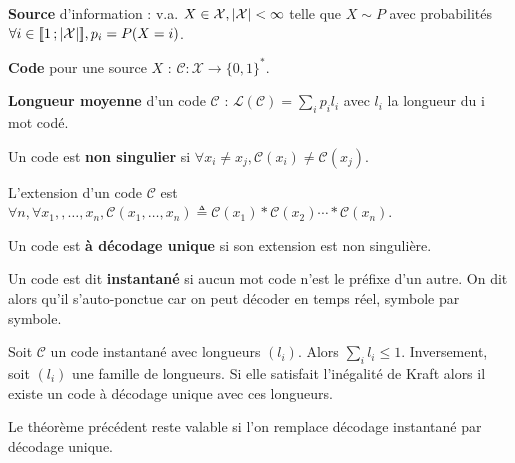 \begin{defn}
	\textbf{Source} d'information : v.a. $X \in \mathcal{X}, \left\lvert\mathcal{X}\right\rvert < \infty$ telle que $X \sim P$ avec probabilités $\forall i \in \mathopen{[\![}1\mathclose{}\mathpunct{};\left\lvert\mathcal{X}\right\rvert\mathclose{]\!]}, p_i = P(X = i)$.
\end{defn}

\begin{defn}
	\textbf{Code} pour une source $X$ : $\mathcal{C} \colon \mathcal{X} \to \{ 0,1 \}^*$.
\end{defn}

\begin{defn}
	\textbf{Longueur moyenne} d'un code $\mathcal{C}$ : $\mathcal{L}(\mathcal{C}) = \sum_i p_i l_i$ avec $l_i$ la longueur du i mot codé.
\end{defn}

\begin{defn}
	Un code est \textbf{non singulier} si $\forall x_i \neq x_j, \mathcal{C}(x_i) \neq \mathcal{C}(x_j)$.
\end{defn}

\begin{defn}
	L'extension d'un code $\mathcal{C}$ est $\forall n, \forall x_1,, \ldots, x_n, \mathcal{C}(x_1, \ldots, x_n) \triangleq \mathcal{C}(x_1) * \mathcal{C}(x_2) \cdots * \mathcal{C}(x_n)$.
\end{defn}

\begin{defn}
	Un code est \textbf{à décodage unique} si son extension est non singulière.
\end{defn}

\begin{defn}
	Un code est dit \textbf{instantané} si aucun mot code n'est le préfixe d'un autre.
	On dit alors qu'il s'auto-ponctue car on peut décoder en temps réel, symbole par symbole.
\end{defn}

\begin{thm}
	Soit $\mathcal{C}$ un code instantané avec longueurs $(l_i)$.
	Alors $\sum_i l_i \leq 1$.
	Inversement, soit $(l_i)$ une famille de longueurs.
	Si elle satisfait l'inégalité de Kraft alors il existe un code à décodage unique avec ces longueurs.
\end{thm}

\begin{thm}
	Le théorème précédent reste valable si l'on remplace décodage instantané par décodage unique.
\end{thm}

